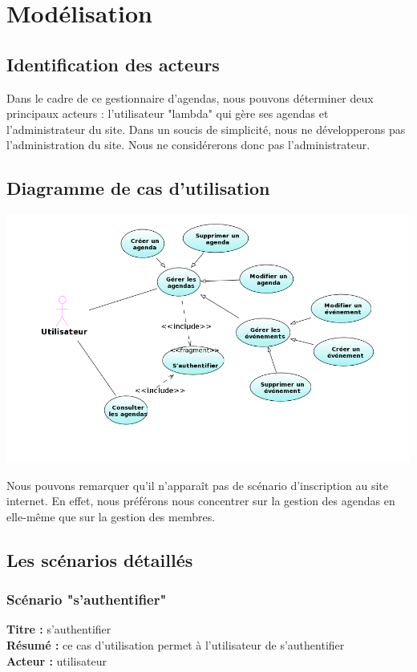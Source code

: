 \documentclass[12pt , a4paper]{article}
\begin{document}
\newpage
\section{Modélisation}
\subsection{Identification des acteurs}
Dans le cadre de  ce gestionnaire d'agendas, nous pouvons déterminer deux  principaux acteurs : l'utilisateur "lambda" qui gère  ses agendas et l'administrateur du site. Dans  un soucis de simplicité,
nous ne développerons pas l'administration du site. Nous ne considérerons donc pas l'administrateur.
\subsection{Diagramme de cas d'utilisation}
	\begin{center}
	  \includegraphics[scale=0.6]{./images/use_cases.png}
	\end{center}
\noindent Nous pouvons remarquer qu'il  n'apparaît pas de scénario d'inscription au site internet. En effet,  nous préférons nous concentrer sur la gestion des agendas  en elle-même que sur la gestion
des membres.

\newpage
\subsection{Les scénarios détaillés}
\subsubsection{Scénario "s'authentifier"}

\noindent\textbf{Titre : } s'authentifier\\
\textbf{Résumé : } ce cas d'utilisation permet à l'utilisateur de s'authentifier\\
\textbf{Acteur : }utilisateur\\
\end{document}
